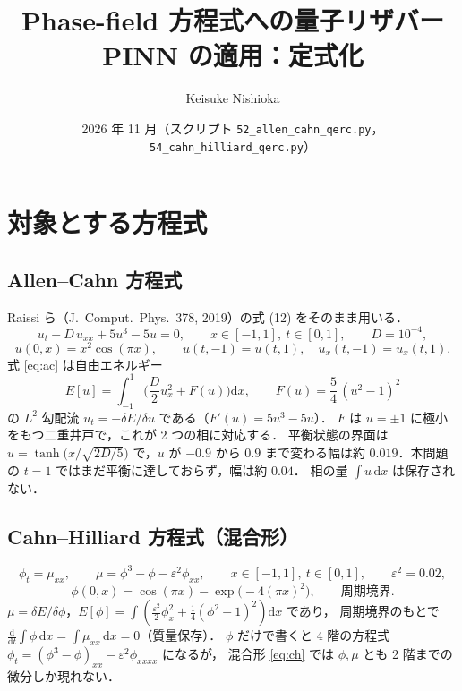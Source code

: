 \documentclass[uplatex,dvipdfmx,a4paper,11pt]{jsarticle}
\title{Phase-field 方程式への量子リザバー PINN の適用：定式化}
\author{Keisuke Nishioka}
\date{2026 年 11 月（スクリプト \texttt{52\_allen\_cahn\_qerc.py}，\texttt{54\_cahn\_hilliard\_qerc.py}）}
\newcommand{\dd}{\mathrm{d}}
\begin{document}
\maketitle

\section{対象とする方程式}

\subsection{Allen--Cahn 方程式}
Raissi ら（J.\ Comput.\ Phys.\ 378, 2019）の式 (12) をそのまま用いる．
\begin{equation}
  u_t - D\,u_{xx} + 5u^3 - 5u = 0,\qquad x\in[-1,1],\ t\in[0,1],\qquad D = 10^{-4},
  \label{eq:ac}
\end{equation}
\begin{equation}
  u(0,x) = x^2\cos(\pi x),\qquad u(t,-1)=u(t,1),\quad u_x(t,-1)=u_x(t,1).
\end{equation}
式 \eqref{eq:ac} は自由エネルギー
\begin{equation}
  E[u] = \int_{-1}^{1}\Big(\frac{D}{2}u_x^2 + F(u)\Big)\dd x,\qquad F(u)=\frac{5}{4}\,(u^2-1)^2
\end{equation}
の $L^2$ 勾配流 $u_t = -\delta E/\delta u$ である（$F'(u)=5u^3-5u$）．
$F$ は $u=\pm1$ に極小をもつ二重井戸で，これが 2 つの相に対応する．
平衡状態の界面は $u=\tanh\big(x/\sqrt{2D/5}\big)$ で，$u$ が $-0.9$ から $0.9$ まで変わる幅は約 $0.019$．本問題の $t=1$ ではまだ平衡に達しておらず，幅は約 $0.04$．
相の量 $\int u\,\dd x$ は保存されない．

\subsection{Cahn--Hilliard 方程式（混合形）}
\begin{equation}
  \phi_t = \mu_{xx},\qquad \mu = \phi^3-\phi-\varepsilon^2\phi_{xx},\qquad x\in[-1,1],\ t\in[0,1],\qquad \varepsilon^2=0.02,
  \label{eq:ch}
\end{equation}
\begin{equation}
  \phi(0,x) = \cos(\pi x) - \exp\!\big(-4(\pi x)^2\big),\qquad \text{周期境界}.
\end{equation}
$\mu=\delta E/\delta\phi$，$E[\phi]=\int(\tfrac{\varepsilon^2}{2}\phi_x^2+\tfrac14(\phi^2-1)^2)\dd x$ であり，
周期境界のもとで $\frac{\dd}{\dd t}\int\phi\,\dd x=\int\mu_{xx}\,\dd x=0$（質量保存）．
$\phi$ だけで書くと 4 階の方程式 $\phi_t=(\phi^3-\phi)_{xx}-\varepsilon^2\phi_{xxxx}$ になるが，
混合形 \eqref{eq:ch} では $\phi,\mu$ とも 2 階までの微分しか現れない．
\end{document}

